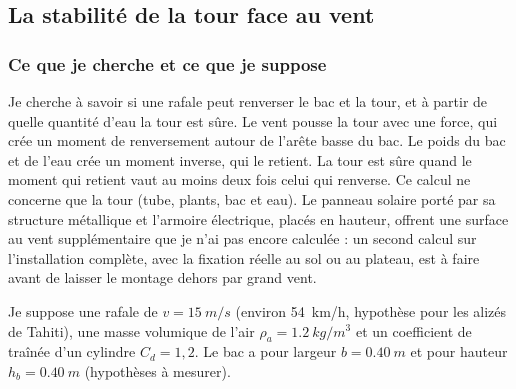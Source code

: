 \subsection{La stabilité de la tour face au vent}

\subsubsection*{Ce que je cherche et ce que je suppose}

Je cherche à savoir si une rafale peut renverser le bac et la tour, et à partir de quelle quantité d'eau la tour est sûre. Le vent pousse la tour avec une force, qui crée un moment de renversement autour de l'arête basse du bac. Le poids du bac et de l'eau crée un moment inverse, qui le retient. La tour est sûre quand le moment qui retient vaut au moins deux fois celui qui renverse. Ce calcul ne concerne que la tour (tube, plants, bac et eau). Le panneau solaire porté par sa structure métallique et l'armoire électrique, placés en hauteur, offrent une surface au vent supplémentaire que je n'ai pas encore calculée : un second calcul sur l'installation complète, avec la fixation réelle au sol ou au plateau, est à faire avant de laisser le montage dehors par grand vent.

Je suppose une rafale de $v = \qty{15}{m/s}$ (environ \qty{54}{km/h}, hypothèse pour les alizés de Tahiti), une masse volumique de l'air $\rho_a = \qty{1,2}{kg/m^3}$ et un coefficient de traînée d'un cylindre $C_d = 1{,}2$. Le bac a pour largeur $b = \qty{0,40}{m}$ et pour hauteur $h_b = \qty{0,40}{m}$ (hypothèses à mesurer).

